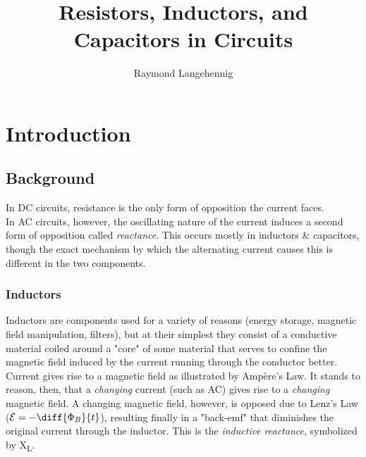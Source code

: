 \documentclass{article}
\title{Resistors, Inductors, and Capacitors in Circuits}
\author{Raymond Langehennig}
\begin{document}
\maketitle

	\section{Introduction}
		\subsection{Background}
			In DC circuits, resistance is the only form of opposition the current faces.\\
			In AC circuits, however, the oscillating nature of the current induces a second form of opposition called \emph{reactance}. This occurs mostly in inductors \& capacitors, though the exact mechanism by which the alternating current causes this is different in the two components.
			
			\subsubsection*{Inductors}
				Inductors are components used for a variety of reasons (energy storage, magnetic field manipulation, filters), but at their simplest they consist of a conductive material coiled around a "core" of some material that serves to confine the magnetic field induced by the current running through the conductor better.\\
				Current gives rise to a magnetic field as illustrated by Amp\`ere's Law. It stands to reason, then, that a \emph{changing} current (such as AC) gives rise to a \emph{changing} magnetic field. A changing magnetic field, however, is opposed due to Lenz's Law ($\mathcal{E} = -\diff{\Phi_B}{t}$), resulting finally in a "back-emf" that diminishes the original current through the inductor. This is the \emph{inductive reactance}, symbolized by X\textsubscript{L}.
\end{document}
